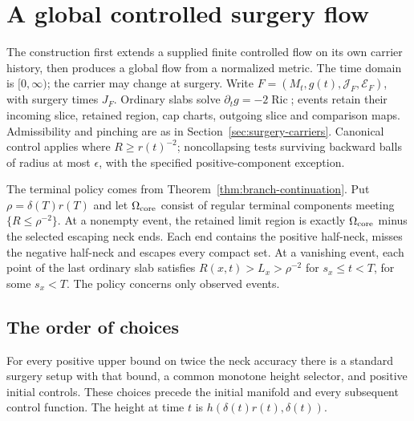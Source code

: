 \chapter{A global controlled surgery flow}
\label{ch:global-surgery-v4}

The construction first extends a supplied finite controlled flow on its own
carrier history, then produces a global flow from a normalized metric.
The time domain is $[0,\infty)$; the carrier may change at surgery.
Write $F=(M_t,g(t),\mathcal J_F,\mathcal E_F)$, with surgery times $J_F$.
Ordinary slabs solve $\partial_tg=-2\operatorname{Ric}$; events retain their
incoming slice, retained region, cap charts, outgoing slice and comparison
maps. Admissibility and pinching are as in Section~\ref{sec:surgery-carriers}.
Canonical control applies where $R\geq r(t)^{-2}$; noncollapsing tests
surviving backward balls of radius at most $\epsilon$, with the specified
positive-component exception.

The terminal policy comes from Theorem~\ref{thm:branch-continuation}.
Put $\rho=\delta(T)r(T)$ and let $\Omega_{\rm core}$ consist of regular
terminal components meeting $\{R\leq\rho^{-2}\}$. At a nonempty event,
the retained limit region is exactly $\Omega_{\rm core}$ minus the selected
escaping neck ends. Each end contains the positive half-neck, misses the
negative half-neck and escapes every compact set. At a vanishing event,
each point of the last ordinary slab satisfies $R(x,t)>L_x>\rho^{-2}$
for $s_x\leq t<T$, for some $s_x<T$. The policy concerns only observed events.

\section{The order of choices}
\label{sec:global-choice-order}

\begin{theorem}
\label{thm:global-setup}
For every positive upper bound on twice the neck accuracy there is a
standard surgery setup with that bound, a common monotone height selector,
and positive initial controls. These choices precede the initial manifold
and every subsequent control function. The height at time $t$ is
$h(\delta(t)r(t),\delta(t))$.
\end{theorem}

